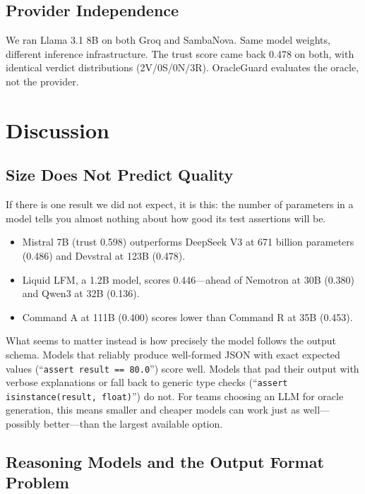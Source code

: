 \documentclass[conference]{IEEEtran}
\begin{document}
\subsection{Provider Independence}

We ran Llama 3.1 8B on both Groq and SambaNova. Same model weights, different inference infrastructure. The trust score came back 0.478 on both, with identical verdict distributions (2V/0S/0N/3R). OracleGuard evaluates the oracle, not the provider.

\section{Discussion}

\subsection{Size Does Not Predict Quality}

If there is one result we did not expect, it is this: the number of parameters in a model tells you almost nothing about how good its test assertions will be.

\begin{itemize}
\item Mistral 7B (trust 0.598) outperforms DeepSeek V3 at 671 billion parameters (0.486) and Devstral at 123B (0.478).
\item Liquid LFM, a 1.2B model, scores 0.446---ahead of Nemotron at 30B (0.380) and Qwen3 at 32B (0.136).
\item Command A at 111B (0.400) scores lower than Command R at 35B (0.453).
\end{itemize}

What seems to matter instead is how precisely the model follows the output schema. Models that reliably produce well-formed JSON with exact expected values (``\texttt{assert result == 80.0}'') score well. Models that pad their output with verbose explanations or fall back to generic type checks (``\texttt{assert isinstance(result, float)}'') do not. For teams choosing an LLM for oracle generation, this means smaller and cheaper models can work just as well---possibly better---than the largest available option.

\subsection{Reasoning Models and the Output Format Problem}
\end{document}
